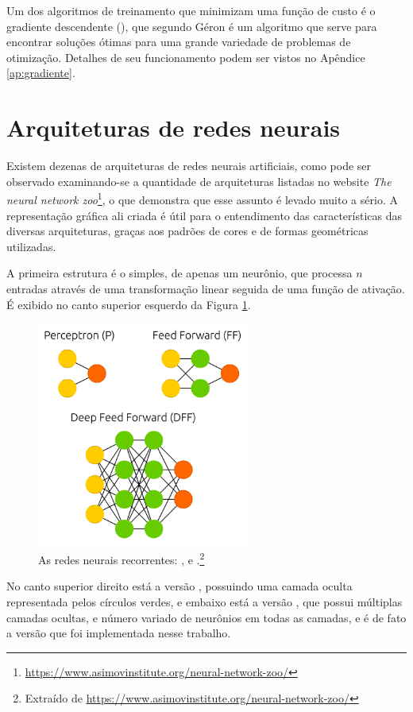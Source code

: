 Um dos algoritmos de treinamento que minimizam uma função de custo é o gradiente descendente (), que segundo Géron \citep{hands} é um algoritmo que serve para encontrar soluções ótimas para uma grande variedade de problemas de otimização. Detalhes de seu funcionamento podem ser vistos no Apêndice \ref{ap:gradiente}.

\section{Arquiteturas de redes neurais}

Existem dezenas de arquiteturas de redes neurais artificiais, como pode ser observado examinando-se a quantidade de arquiteturas listadas no website \emph{The neural network zoo}\footnote{\url{https://www.asimovinstitute.org/neural-network-zoo/}}, o que demonstra que esse assunto é levado muito a sério. A representação gráfica ali criada é útil para o entendimento das características das diversas arquiteturas, graças aos padrões de cores e de formas geométricas utilizadas.

A primeira estrutura é o  simples, de apenas um neurônio, que processa $n$ entradas através de uma transformação linear seguida de uma função de ativação. É exibido no canto superior esquerdo da Figura \ref{fig:estrutura_p}.

\begin{figure}[htb]
\centering
\includegraphics[width=7cm]{figuras/estrutura_p}
\caption{As redes neurais recorrentes: ,  e .\footnote{Extraído de \url{https://www.asimovinstitute.org/neural-network-zoo/}}}
\label{fig:estrutura_p}
\end{figure}

No canto superior direito está a versão , possuindo uma camada oculta representada pelos círculos verdes, e embaixo está a versão , que possui múltiplas camadas ocultas, e número variado de neurônios em todas as camadas, e é de fato a versão que foi implementada nesse trabalho.


